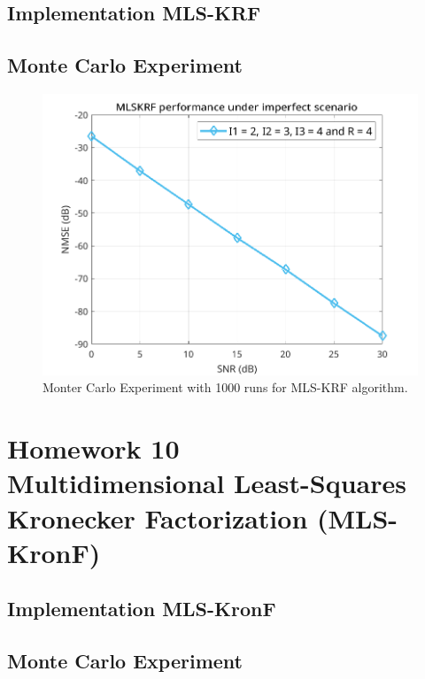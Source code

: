 \documentclass[a4paper,10pt]{article}
\begin{document}
    \subsection*{Implementation MLS-KRF}

    \subsection*{Monte Carlo Experiment}

    \begin{figure}[ht!]
        \centering 
        \includegraphics[width=0.75\linewidth]{figs/hw9.png} \par 
        \caption{Monter Carlo Experiment with 1000 runs for MLS-KRF algorithm.}
        \label{fig:hw9} 
    \end{figure}

\newpage
\section*{Homework 10 \\ Multidimensional Least-Squares Kronecker Factorization
(MLS-KronF)}

    \subsection*{Implementation MLS-KronF}

    \subsection*{Monte Carlo Experiment}
\end{document}
